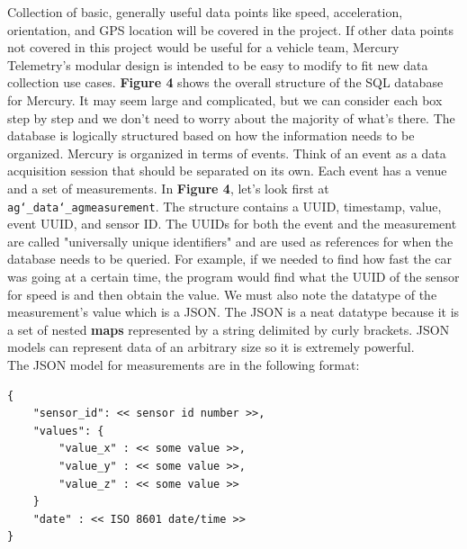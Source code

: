 \documentclass[12pt, letterpaper]{article}
\begin{document}
	Collection of basic, generally useful data points like speed, acceleration, orientation, and GPS location will be covered in the project. If other data points not covered in this project would be useful for a vehicle team, Mercury Telemetry's modular design is intended to be easy to modify to fit new data collection use cases.
	\textbf{Figure 4} shows the overall structure of the SQL database for Mercury. It may seem large and complicated, but we can consider each box step by step and we don't need to worry about the majority of what's there. The database is logically structured  based on how the information needs to be organized. Mercury is organized in terms of events. Think of an event as a data acquisition session that should be separated on its own. Each event has a venue and a set of measurements. In \textbf{Figure 4}, let's look first at \texttt{ag\char`_data\char`_agmeasurement}. The structure contains a UUID, timestamp, value, event UUID, and sensor ID. The UUIDs for both the event and the measurement are called "universally unique identifiers" and are used as references for when the database needs to be queried. For example, if we needed to find how fast the car was going at a certain time, the program would find what the UUID of the sensor for speed is and then obtain the value. We must also note the datatype of the measurement's value which is a JSON. The JSON is a neat datatype because it is a set of nested \textbf{maps} represented by a string delimited by curly brackets. JSON models can represent data of an arbitrary size so it is extremely powerful. \\[3\baselineskip]
	The JSON model for measurements are in the following format:
	
\begin{verbatim}
{
    "sensor_id": << sensor id number >>,
    "values": {
        "value_x" : << some value >>,
        "value_y" : << some value >>,
        "value_z" : << some value >>
    }
    "date" : << ISO 8601 date/time >>
}
\end{verbatim}
\end{document}
